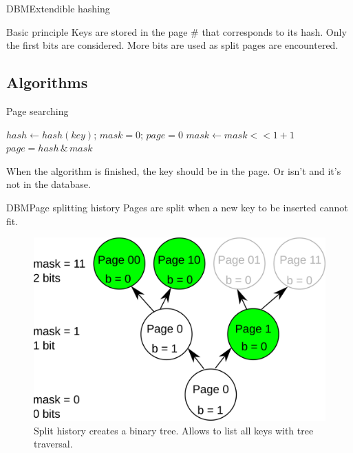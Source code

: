 \documentclass{beamer}
\begin{document}
\begin{frame}{DBM}{Extendible hashing}
\begin{block}{Basic principle}
Keys are stored in the page \# that corresponds to its hash. Only the first
bits are considered. More bits are used as split pages are
encountered.
\end{block}

\subsection{Algorithms}

\begin{block}{Page searching}
\begin{algorithm}[H]
$hash \leftarrow hash(key)$; $mask = 0$; $page = 0$\;
{
$mask \leftarrow mask << 1 + 1$\; 
}
$page = hash\,\&\,mask$\;
\end{algorithm}
When the algorithm is finished, the key should be in the page. Or isn't and
it's not in the database.
\end{block}

\end{frame}

\begin{frame}{DBM}{Page splitting history}
Pages are split when a new key to be inserted cannot fit.
\begin{figure}
\includegraphics[scale=1]{split_pages.png}
\caption{Split history creates a binary tree. Allows to list all keys with
tree traversal.}
\end{figure}
\end{frame}
\end{document}
